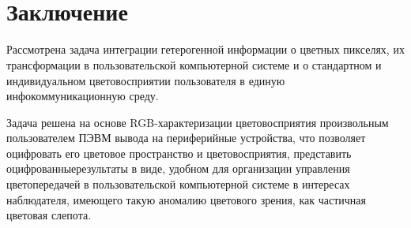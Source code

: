 \begin{multicols}{2}
\begin{figure*} %
\vspace*{1pt}
\begin{center}
\mbox{%
\epsfxsize=123.825mm
}
\end{center}
\vspace*{-6pt}
\end{figure*}

\begin{figure*} %
\vspace*{1pt}
\begin{center}
\mbox{%
\epsfxsize=123.825mm
}
\end{center}
\vspace*{-6pt}
\end{figure*}
  

\vspace*{-8pt}

\section{Заключение}

\vspace*{-4pt}
  
  Рассмотрена задача интеграции гетерогенной информации о цветных 
пикселях, их трансформации в пользовательской компьютерной системе и о 
стандартном и индивидуальном цветовосприятии пользователя в единую 
инфокоммуникационную среду. 
  
  Задача решена на основе RGB-ха\-рак\-те\-ри\-за\-ции цветовосприятия 
произвольным пользователем ПЭВМ вывода на периферийные устрой\-ства, что\linebreak 
позволяет оцифровать его цветовое пространство и цветовосприятия, 
представить оцифрованные\linebreak результаты в виде, удобном для организации\linebreak 
управ\-ле\-ния цветопередачей в пользовательской ком\-пьютерной системе в 
интересах наблюдателя, име\-ющего такую аномалию цветового зрения, как 
частичная цветовая слепота.
  

\end{multicols}
